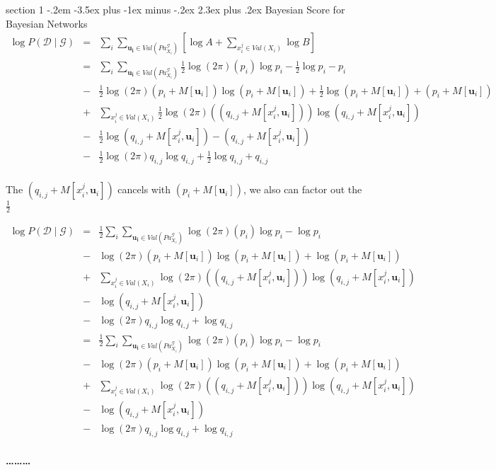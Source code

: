 \documentclass[12pt]{article}
\makeatletter
\newenvironment{problem}{\@startsection
       {section}
       {1}
       {-.2em}
       {-3.5ex plus -1ex minus -.2ex}
       {2.3ex plus .2ex}
       {\pagebreak[3]%
       \large\bf\noindent{Problem }
       }
       }
       {%
       \begin{center}\large\bf \ldots\ldots\ldots\end{center}}
\makeatother
\begin{document}
\begin{problem}{Bayesian Score for Bayesian Networks}
\begin{eqnarray*}
\log P( \mathcal{D} \mid \mathcal{G}) & = & 
	\sum_{i} \sum_{\mathbf{u_{i}} \in Val(Pa^{\mathcal{G}}_{X_{i}})} 
	\left[ \log A + 
	\sum_{x_{i}^{j} \in Val(X_{i})} 
	\log B \right] \\
& = & 
	\sum_{i} \sum_{\mathbf{u_{i}} \in Val(Pa^{\mathcal{G}}_{X_{i}})} 
	\frac{1}{2} \log (2 \pi) (p_{i}) \log p_{i}  - \frac{1}{2} \log p_{i} - p_{i} \\
	& - &\frac{1}{2} \log (2 \pi)  (p_{i} + M[ \mathbf{u}_{i}]) \log  (p_{i} + M[ \mathbf{u}_{i}])  + \frac{1}{2} \log (p_{i} + M[ \mathbf{u}_{i}]) +(p_{i} + M[ \mathbf{u}_{i}]) \\
	& + &\sum_{x_{i}^{j} \in Val(X_{i})} 
	\frac{1}{2} \log (2 \pi) ((q_{i,j}  + M[ x_{i}^{j},\mathbf{u}_{i}])) \log (q_{i,j}  + M[ x_{i}^{j},\mathbf{u}_{i}])\\
	& - &\frac{1}{2} \log (q_{i,j}  + M[ x_{i}^{j},\mathbf{u}_{i}]) - (q_{i,j}  + M[ x_{i}^{j},\mathbf{u}_{i}]) \\
	& - &\frac{1}{2} \log (2 \pi) q_{i,j} \log q_{i,j}  + \frac{1}{2} \log q_{i,j}+ q_{i,j} \\
\end{eqnarray*}

The $(q_{i,j}  + M[ x_{i}^{j},\mathbf{u}_{i}])$ cancels with $(p_{i} + M[ \mathbf{u}_{i}])$, we also can factor out the $\frac{1}{2}$

\begin{eqnarray*}
\log P( \mathcal{D} \mid \mathcal{G}) & = & 
	\frac{1}{2} \sum_{i} \sum_{\mathbf{u_{i}} \in Val(Pa^{\mathcal{G}}_{X_{i}})} 
	 \log (2 \pi) (p_{i}) \log p_{i}  -  \log p_{i} \\
	& - & \log (2 \pi)  (p_{i} + M[ \mathbf{u}_{i}]) \log  (p_{i} + M[ \mathbf{u}_{i}])  + \log (p_{i} + M[ \mathbf{u}_{i}])  \\
	& + &\sum_{x_{i}^{j} \in Val(X_{i})} 
	 \log (2 \pi) ((q_{i,j}  + M[ x_{i}^{j},\mathbf{u}_{i}])) \log (q_{i,j}  + M[ x_{i}^{j},\mathbf{u}_{i}])\\
	& - & \log (q_{i,j}  + M[ x_{i}^{j},\mathbf{u}_{i}]) \\
	& - &\log (2 \pi) q_{i,j} \log q_{i,j}  +\log q_{i,j}\\
& = & 
	\frac{1}{2} \sum_{i} \sum_{\mathbf{u_{i}} \in Val(Pa^{\mathcal{G}}_{X_{i}})} 
	 \log (2 \pi) (p_{i}) \log p_{i}  -  \log p_{i} \\
	& - & \log (2 \pi)  (p_{i} + M[ \mathbf{u}_{i}]) \log  (p_{i} + M[ \mathbf{u}_{i}])  + \log (p_{i} + M[ \mathbf{u}_{i}])  \\
	& + &\sum_{x_{i}^{j} \in Val(X_{i})} 
	 \log (2 \pi) ((q_{i,j}  + M[ x_{i}^{j},\mathbf{u}_{i}])) \log (q_{i,j}  + M[ x_{i}^{j},\mathbf{u}_{i}])\\
	& - & \log (q_{i,j}  + M[ x_{i}^{j},\mathbf{u}_{i}]) \\
	& - &\log (2 \pi) q_{i,j} \log q_{i,j}  +\log q_{i,j}\\
\end{eqnarray*}


\end{problem}
\end{document}
